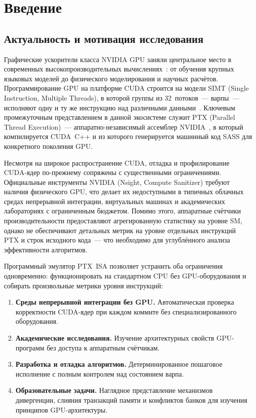 \section{Введение}

\subsection{Актуальность и мотивация исследования}

Графические ускорители класса NVIDIA GPU заняли центральное место
в современных высокопроизводительных вычислениях~\cite{Gergel2010, GergelStrongin2003}: от обучения крупных
языковых моделей до физического моделирования и научных расчётов.
Программирование GPU на платформе CUDA строится на модели SIMT
(Single Instruction, Multiple Threads), в которой группы из 32~потоков~---
варпы~--- исполняют одну и ту же инструкцию над различными данными~\cite{Lindholm2008, Nickolls2008}.
Ключевым промежуточным представлением в данной экосистеме служит PTX
(Parallel Thread Execution)~--- аппаратно-независимый ассемблер NVIDIA~\cite{PTXISA},
в который компилируется CUDA~C++ и из которого генерируется машинный
код SASS для конкретного поколения GPU.

Несмотря на широкое распространение CUDA, отладка и профилирование
CUDA-ядер по-прежнему сопряжены с существенными ограничениями.
Официальные инструменты NVIDIA (Nsight, Compute Sanitizer) требуют
наличия физического GPU, что делает их недоступными в типичных
облачных средах непрерывной интеграции, виртуальных машинах и
академических лабораториях с ограниченным бюджетом. Помимо этого,
аппаратные счётчики производительности предоставляют агрегированную
статистику на уровне SM, однако не обеспечивают детальных метрик
на уровне отдельных инструкций PTX и строк исходного кода~---
что необходимо для углублённого анализа эффективности алгоритмов.

Программный эмулятор PTX~ISA позволяет устранить оба ограничения
одновременно: функционировать на стандартном CPU без GPU-оборудования и
собирать произвольные метрики уровня инструкций:

\begin{enumerate}
  \item \textbf{Среды непрерывной интеграции без GPU.} Автоматическая
        проверка корректности CUDA-ядер при каждом коммите без
        специализированного оборудования.
  \item \textbf{Академические исследования.} Изучение архитектурных
        свойств GPU-программ без доступа к аппаратным счётчикам.
  \item \textbf{Разработка и отладка алгоритмов.} Детерминированное
        пошаговое исполнение с полным контролем над состоянием варпа.
  \item \textbf{Образовательные задачи.} Наглядное представление
        механизмов дивергенции, слияния транзакций памяти и конфликтов
        банков для изучения принципов GPU-архитектуры.
\end{enumerate}


